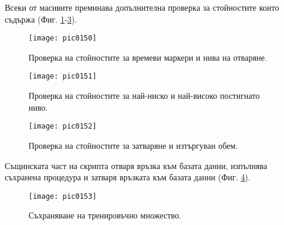 Всеки от масивите преминава допълнителна проверка за стойностите които съдържа (Фиг. \ref{fig:pic0150}-\ref{fig:pic0152}).

\begin{figure}[h]
  \centering
  \texttt{[image: pic0150]}
  \caption{Проверка на стойностите за времеви маркери и нива на отваряне.}
\label{fig:pic0150}
\end{figure}
\FloatBarrier

\begin{figure}[h]
  \centering
  \texttt{[image: pic0151]}
  \caption{Проверка на стойностите за най-ниско и най-високо постигнато ниво.}
\label{fig:pic0151}
\end{figure}
\FloatBarrier

\begin{figure}[h]
  \centering
  \texttt{[image: pic0152]}
  \caption{Проверка на стойностите за затваряне и изтъргуван обем.}
\label{fig:pic0152}
\end{figure}
\FloatBarrier

Същинската част на скрипта отваря връзка към базата данни, изпълнява съхранена процедура и затваря връзката към базата данни (Фиг. \ref{fig:pic0153}).

\begin{figure}[h]
  \centering
  \texttt{[image: pic0153]}
  \caption{Съхраняване на тренировъчно множество.}
\label{fig:pic0153}
\end{figure}
\FloatBarrier